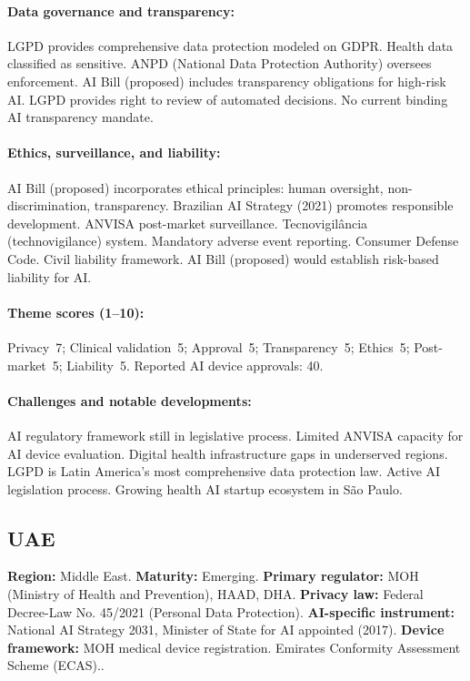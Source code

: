 {\paragraph{Data governance and transparency:}
LGPD provides comprehensive data protection modeled on GDPR. Health data classified as sensitive. ANPD (National Data Protection Authority) oversees enforcement.
AI Bill (proposed) includes transparency obligations for high-risk AI. LGPD provides right to review of automated decisions. No current binding AI transparency mandate.

\paragraph{Ethics, surveillance, and liability:}
AI Bill (proposed) incorporates ethical principles: human oversight, non-discrimination, transparency. Brazilian AI Strategy (2021) promotes responsible development.
ANVISA post-market surveillance. Tecnovigilância (technovigilance) system. Mandatory adverse event reporting.
Consumer Defense Code. Civil liability framework. AI Bill (proposed) would establish risk-based liability for AI.

\paragraph{Theme scores (1--10):}
Privacy~7;
Clinical validation~5;
Approval~5;
Transparency~5;
Ethics~5;
Post-market~5;
Liability~5.
Reported AI device approvals: 40.

\paragraph{Challenges and notable developments:}
AI regulatory framework still in legislative process. Limited ANVISA capacity for AI device evaluation. Digital health infrastructure gaps in underserved regions.
LGPD is Latin America's most comprehensive data protection law. Active AI legislation process. Growing health AI startup ecosystem in São Paulo.


\subsection{UAE}
\textbf{Region:} Middle East.
\textbf{Maturity:} Emerging.
\textbf{Primary regulator:} MOH (Ministry of Health and Prevention), HAAD, DHA.
\textbf{Privacy law:} Federal Decree-Law No. 45/2021 (Personal Data Protection).
\textbf{AI-specific instrument:} National AI Strategy 2031, Minister of State for AI appointed (2017).
\textbf{Device framework:} MOH medical device registration. Emirates Conformity Assessment Scheme (ECAS)..

}
